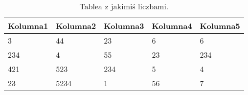 \begin{table}[htbp]
\centering
\begin{tabular}{|l|l|l|l|l|} 
 \hline
 Kolumna1 & Kolumna2 & Kolumna3 & Kolumna4 & Kolumna5 \\ \hline 
3   & 44   & 23  & 6  & 6   \\ \hline
234 & 4    & 55  & 23 & 234 \\ \hline
421 & 523  & 234 & 5  & 4   \\ \hline
23  & 5234 & 1   & 56 & 7  \\ \hline
\end{tabular}
\label{tab:numbers}
\caption{Tablea z jakimiś liczbami.}
\end{table}